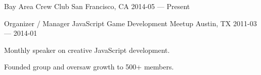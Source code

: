 


\begin{cventries}

  \cventry
    {Bay Area Crew Club} %
    {} %
    {San Francisco, CA} %
    {2014-05 — Present} %
    {}


  \cventry
    {Organizer / Manager} %
    {JavaScript Game Development Meetup} %
    {Austin, TX} %
    {2011-03 — 2014-01} %
    {
      \begin{cvitems} %
        \item {Monthly speaker on creative JavaScript development.}
        \item {Founded group and oversaw growth to 500+ members.}
      \end{cvitems}
    }


\end{cventries}

